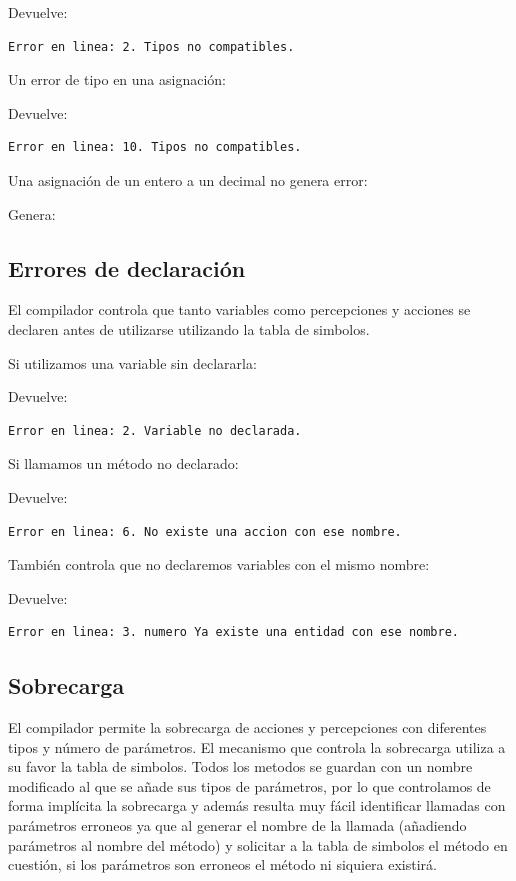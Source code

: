 \documentclass[11pt]{article}
\begin{document}
Devuelve:

\begin{lstlisting}[style=J]
Error en linea: 2. Tipos no compatibles.
\end{lstlisting}


Un error de tipo en una asignación:


Devuelve:

\begin{lstlisting}[style=J]
Error en linea: 10. Tipos no compatibles.
\end{lstlisting}


Una asignación de un entero a un decimal no genera error:


Genera:




\subsection{Errores de declaración}
El compilador controla que tanto variables como percepciones y acciones se declaren antes de utilizarse utilizando la tabla de simbolos.


Si utilizamos una variable sin declararla:


Devuelve:
\begin{lstlisting}[style=J]
Error en linea: 2. Variable no declarada.
\end{lstlisting}

Si llamamos un método no declarado:


Devuelve:
\begin{lstlisting}[style=J]
Error en linea: 6. No existe una accion con ese nombre.
\end{lstlisting}

También controla que no declaremos variables con el mismo nombre:


Devuelve:
\begin{lstlisting}[style=J]
Error en linea: 3. numero Ya existe una entidad con ese nombre.
\end{lstlisting}

\subsection{Sobrecarga}
El compilador permite la sobrecarga de acciones y percepciones con diferentes tipos y número de parámetros.
El mecanismo que controla la sobrecarga utiliza a su favor la tabla de simbolos. Todos los metodos se guardan con un nombre
modificado al que se añade sus tipos de parámetros, por lo que controlamos de forma implícita la sobrecarga y además resulta
muy fácil identificar llamadas con parámetros erroneos ya que al generar el nombre de la llamada (añadiendo parámetros al nombre
del método) y solicitar a la tabla de simbolos el método en cuestión, si los parámetros son erroneos el método ni siquiera existirá.
\end{document}
